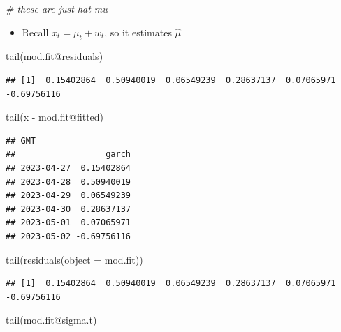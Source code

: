 \documentclass[
]{book}
\newenvironment{Shaded}{\begin{snugshade}}{\end{snugshade}}
\newcommand{\AttributeTok}[1]{\textcolor[rgb]{0.77,0.63,0.00}{#1}}
\newcommand{\CommentTok}[1]{\textcolor[rgb]{0.56,0.35,0.01}{\textit{#1}}}
\newcommand{\FunctionTok}[1]{\textcolor[rgb]{0.00,0.00,0.00}{#1}}
\newcommand{\NormalTok}[1]{#1}
\newcommand{\SpecialCharTok}[1]{\textcolor[rgb]{0.00,0.00,0.00}{#1}}
\providecommand{\tightlist}{%
  \setlength{\itemsep}{0pt}\setlength{\parskip}{0pt}}
\theoremstyle{definition}
\theoremstyle{definition}
\theoremstyle{definition}
\theoremstyle{definition}
\theoremstyle{remark}
\begin{document}
\begin{Shaded}
\begin{Highlighting}[]
\CommentTok{\# these are just hat mu}
\end{Highlighting}
\end{Shaded}

\begin{itemize}
\tightlist
\item
  Recall \(x_t=\mu_t+w_t\), so it estimates \(\hat \mu\)
\end{itemize}

\begin{Shaded}
\begin{Highlighting}[]
\FunctionTok{tail}\NormalTok{(mod.fit}\SpecialCharTok{@}\NormalTok{residuals)}
\end{Highlighting}
\end{Shaded}

\begin{verbatim}
## [1]  0.15402864  0.50940019  0.06549239  0.28637137  0.07065971 -0.69756116
\end{verbatim}

\begin{Shaded}
\begin{Highlighting}[]
\FunctionTok{tail}\NormalTok{(x }\SpecialCharTok{{-}}\NormalTok{ mod.fit}\SpecialCharTok{@}\NormalTok{fitted)}
\end{Highlighting}
\end{Shaded}

\begin{verbatim}
## GMT
##                  garch
## 2023-04-27  0.15402864
## 2023-04-28  0.50940019
## 2023-04-29  0.06549239
## 2023-04-30  0.28637137
## 2023-05-01  0.07065971
## 2023-05-02 -0.69756116
\end{verbatim}

\begin{Shaded}
\begin{Highlighting}[]
\FunctionTok{tail}\NormalTok{(}\FunctionTok{residuals}\NormalTok{(}\AttributeTok{object =}\NormalTok{ mod.fit))}
\end{Highlighting}
\end{Shaded}

\begin{verbatim}
## [1]  0.15402864  0.50940019  0.06549239  0.28637137  0.07065971 -0.69756116
\end{verbatim}

\begin{Shaded}
\begin{Highlighting}[]
\FunctionTok{tail}\NormalTok{(mod.fit}\SpecialCharTok{@}\NormalTok{sigma.t)}
\end{Highlighting}
\end{Shaded}
\end{document}
